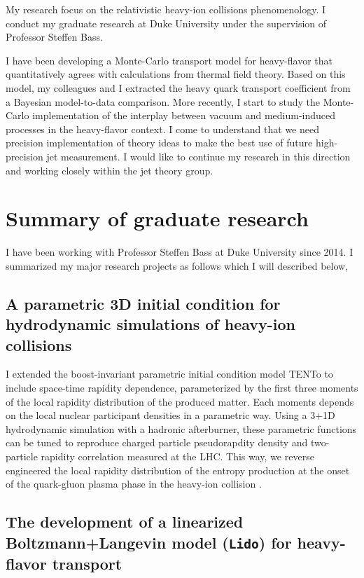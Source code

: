 \documentclass[10pt,a4paper]{article}
\begin{document}
My research focus on the relativistic heavy-ion collisions phenomenology.
I conduct my graduate research at Duke University under the supervision of Professor Steffen Bass.

I have been developing a Monte-Carlo transport model for heavy-flavor that quantitatively agrees with calculations from thermal field theory.
Based on this model, my colleagues and I extracted the heavy quark transport coefficient from a Bayesian model-to-data comparison.
More recently, I start to study the Monte-Carlo implementation of the interplay between vacuum and medium-induced processes in the heavy-flavor context.
I come to understand that we need precision implementation of theory ideas to make the best use of future high-precision jet measurement.
I would like to continue my research in this direction and working closely within the jet theory group.

\section{Summary of graduate research}
I have been working with Professor Steffen Bass at Duke University since 2014. I summarized my major research projects as follows which I will described below,

\subsection{A parametric 3D initial condition for hydrodynamic simulations of heavy-ion collisions}
I extended the boost-invariant parametric initial condition model T\raisebox{-.25em}{R}ENTo to include space-time rapidity dependence, parameterized by the first three moments of the local rapidity distribution of the produced matter. Each moments depends on the local nuclear participant densities in a parametric way. Using a 3+1D hydrodynamic simulation with a hadronic afterburner, these parametric functions can be tuned to reproduce charged particle pseudorapdity density and two-particle rapidity correlation measured at the LHC. This way, we reverse engineered the local rapidity distribution of the entropy production at the onset of the quark-gluon plasma phase in the heavy-ion collision \cite{Ke:2016jrd}.

\subsection{The development of a linearized Boltzmann+Langevin model ({\tt Lido}) for heavy-flavor transport}
\end{document}
